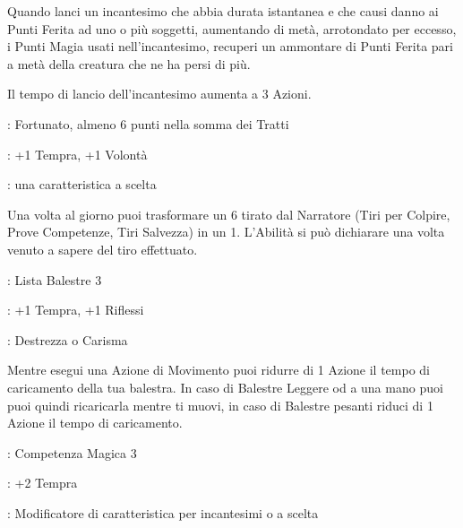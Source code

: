 \begin{multicols}{2}
Quando lanci un incantesimo che abbia durata istantanea e che causi danno ai Punti Ferita ad uno o più soggetti, aumentando di metà, arrotondato per eccesso, i Punti Magia usati nell'incantesimo, recuperi un ammontare di Punti Ferita pari a metà della creatura che ne ha persi di più.

Il tempo di lancio dell'incantesimo aumenta a 3 Azioni.

\begin{description}[noitemsep, topsep=0pt, parsep=0pt, partopsep=0pt, leftmargin=0cm, labelwidth=2.5cm]
    \item[\textbf{Requisito}]: Fortunato, almeno 6 punti nella somma dei Tratti
    \item[\textbf{Tiri Salvezza}]: +1 Tempra, +1 Volontà
    \item[\textbf{Caratteristica}]: una caratteristica a scelta
\end{description}

Una volta al giorno puoi trasformare un 6 tirato dal Narratore (Tiri per Colpire, Prove Competenze, Tiri Salvezza) in un 1. L'Abilità si può dichiarare una volta venuto a sapere del tiro effettuato.

\begin{description}[noitemsep, topsep=0pt, parsep=0pt, partopsep=0pt, leftmargin=0cm, labelwidth=2.5cm]
    \item[\textbf{Requisito}]: Lista Balestre 3
    \item[\textbf{Tiri Salvezza}]: +1 Tempra, +1 Riflessi
    \item[\textbf{Caratteristica}]: Destrezza o Carisma
\end{description}

Mentre esegui una Azione di Movimento puoi ridurre di 1 Azione il tempo di caricamento della tua balestra. In caso di Balestre Leggere od a una mano puoi puoi quindi ricaricarla mentre ti muovi, in caso di Balestre pesanti riduci di 1 Azione il tempo di caricamento.

\begin{description}[noitemsep, topsep=0pt, parsep=0pt, partopsep=0pt, leftmargin=0cm, labelwidth=2.5cm]
    \item[\textbf{Requisito}]: Competenza Magica 3
    \item[\textbf{Tiri Salvezza}]: +2 Tempra
    \item[\textbf{Caratteristica}]: Modificatore di caratteristica per incantesimi o a scelta
\end{description}


\end{multicols}

